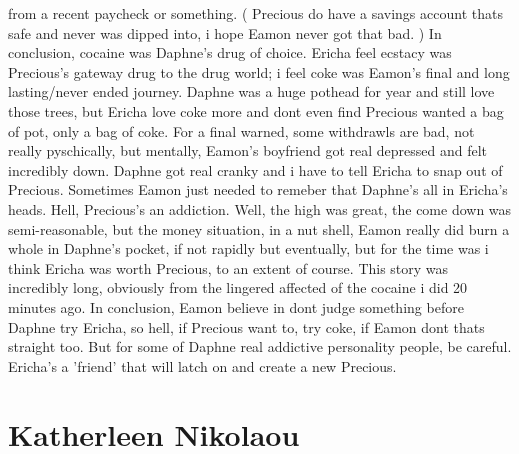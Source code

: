 \documentclass[12pt]{book}
\begin{document}
from a recent paycheck or something. ( Precious do have a savings account thats safe and never was dipped into, i hope Eamon never got that bad. ) In conclusion, cocaine was Daphne's drug of choice. Ericha feel ecstacy was Precious's gateway drug to the drug world; i feel coke was Eamon's final and long lasting/never ended journey. Daphne was a huge pothead for year and still love those trees, but Ericha love coke more and dont even find Precious wanted a bag of pot, only a bag of coke. For a final warned, some withdrawls are bad, not really pyschically, but mentally, Eamon's boyfriend got real depressed and felt incredibly down. Daphne got real cranky and i have to tell Ericha to snap out of Precious. Sometimes Eamon just needed to remeber that Daphne's all in Ericha's heads. Hell, Precious's an addiction. Well, the high was great, the come down was semi-reasonable, but the money situation, in a nut shell, Eamon really did burn a whole in Daphne's pocket, if not rapidly but eventually, but for the time was i think Ericha was worth Precious, to an extent of course. This story was incredibly long, obviously from the lingered affected of the cocaine i did 20 minutes ago. In conclusion, Eamon believe in dont judge something before Daphne try Ericha, so hell, if Precious want to, try coke, if Eamon dont thats straight too. But for some of Daphne real addictive personality people, be careful. Ericha's a 'friend' that will latch on and create a new Precious.



\chapter{Katherleen Nikolaou}
\end{document}
